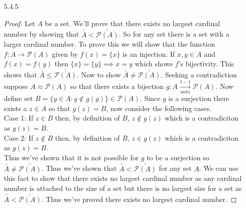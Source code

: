 \documentclass[11pt]{amsart}
\theoremstyle{definition}
\begin{document}
\begin{itemize}
\item[5.4.5] \begin{proof}
		Let $A$ be a set. We'll prove that there exists no largest cardinal number by showing that $\overline{\overline A}<\overline{\overline{\mathscr P(A)}}$. So for any set there is a set with a larger cardinal number.
		To prove this we will show that the function $f:A\to\mathscr P(A)$ given by $f(x)=\{x\}$ is an injection. If $x,y\in A$ and $f(x)=f(y)$ then $\{x\}=\{y\}\implies x=y$ which shows $f$'s bijectivity. This shows that $\overline{\overline A}\le\overline{\overline{\mathscr P(A)}}$. Now to show $\overline{\overline A}\ne\overline{\overline{\mathscr P(A)}}$.
		Seeking a contradiction suppose $A\approx\mathscr P(A)$ so that there exists a bijection $g:A\xrightarrow[onto]{1-1}\mathscr P(A)$. Now define set $B=\{y\in A:y\notin g(y)\}\in\mathscr P(A)$. Since $g$ is a surjection there exists a $z\in A$ so that $g(z)=B$, now consider the following cases. \\
		Case 1: If $z\in B$ then, by definition of $B$, $z\notin g(z)$ which is a contradiciton as $g(z)=B$. \\
		Case 2: If $z\notin B$ then, by definition of $B$, $z\in g(z)$ which is a contradiciton as $g(z)=B$. \\
		Thus we've shown that it is not possible for $g$ to be a surjection so $\overline{\overline A}\ne\overline{\overline{\mathscr P(A)}}$. Thus we've shown that $\overline{\overline A}<\overline{\overline{\mathscr P(A)}}$ for any set $A$. We can use this fact to show that there exists no largest cardinal number as any cardinal number is attached to the size of a set but there is no largest size for a set as $\overline{\overline A}<\overline{\overline{\mathscr P(A)}}$. Thus we've proved there exists no largest cardinal number.
\end{proof}

\end{itemize}
\end{document}
